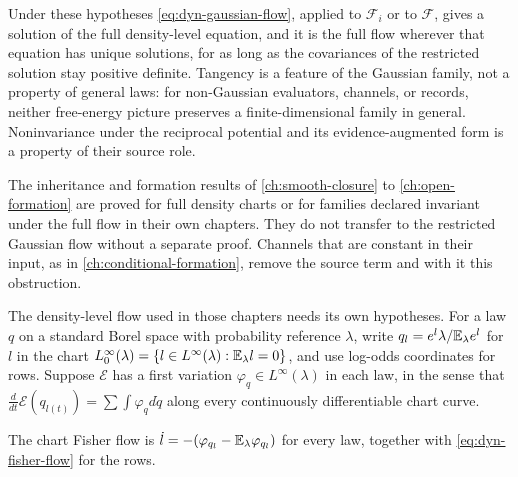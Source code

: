 Under these hypotheses \cref{eq:dyn-gaussian-flow}, applied to $\mathcal F_i$ or to $\mathcal F$, gives a solution of the full density-level equation, and it is the full flow wherever that equation has unique solutions, for as long as the covariances of the restricted solution stay positive definite. Tangency is a feature of the Gaussian family, not a property of general laws: for non-Gaussian evaluators, channels, or records, neither free-energy picture preserves a finite-dimensional family in general. Noninvariance under the reciprocal potential and its evidence-augmented form is a property of their source role.

The inheritance and formation results of \cref{ch:smooth-closure} to \cref{ch:open-formation} are proved for full density charts or for families declared invariant under the full flow in their own chapters. They do not transfer to the restricted Gaussian flow without a separate proof. Channels that are constant in their input, as in \cref{ch:conditional-formation}, remove the source term and with it this obstruction.

The density-level flow used in those chapters needs its own hypotheses. For a law $q$ on a standard Borel space with probability reference $\lambda$, write $q_l=e^l\lambda/\mathbb E_\lambda e^l$ for $l$ in the chart $L^\infty_0(\lambda)=\{l\in L^\infty(\lambda):\mathbb E_\lambda l=0\}$, and use log-odds coordinates for rows. Suppose $\mathcal E$ has a first variation $\varphi_q\in L^\infty(\lambda)$ in each law, in the sense that $\frac{d}{dt}\mathcal E(q_{l(t)})=\sum\int\varphi_q d\dot q$ along every continuously differentiable chart curve.

The chart Fisher flow is $\dot l=-(\varphi_{q_l}-\mathbb E_\lambda\varphi_{q_l})$ for every law, together with \cref{eq:dyn-fisher-flow} for the rows.

